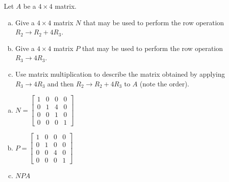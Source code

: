 
\begin{exerciseStatement}


Let \(A\) be a \(4 \times 4\) matrix.


\begin{enumerate}[(a)]
\item Give a \(4 \times 4\) matrix \(N\) that may be used to perform the row operation \( R_2 \to R_2 + 4R_3 \).
\item Give a \(4 \times 4\) matrix \(P\) that may be used to perform the row operation \( R_3 \to 4R_3 \).
\item Use matrix multiplication to describe the matrix obtained by applying \( R_3 \to 4R_3 \) and then \( R_2 \to R_2 + 4R_3 \) to \(A\) (note the order). 
\end{enumerate}
    
\end{exerciseStatement}
    
\begin{exerciseAnswer} 

\begin{enumerate}[(a)]
\item \(N= \left[\begin{array}{cccc}
1 & 0 & 0 & 0 \\
0 & 1 & 4 & 0 \\
0 & 0 & 1 & 0 \\
0 & 0 & 0 & 1
\end{array}\right] \)
\item \(P= \left[\begin{array}{cccc}
1 & 0 & 0 & 0 \\
0 & 1 & 0 & 0 \\
0 & 0 & 4 & 0 \\
0 & 0 & 0 & 1
\end{array}\right] \)
\item \(NPA\)
\end{enumerate}
    
\end{exerciseAnswer}
    
